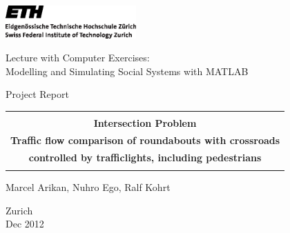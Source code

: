 \thispagestyle{empty}

\begin{center}
\includegraphics[width=5cm]{images/ETHlogo.eps}

\bigskip


\bigskip


\bigskip


\LARGE{ 	Lecture with Computer Exercises:\\ }
\LARGE{ Modelling and Simulating Social Systems with MATLAB\\}

\bigskip

\bigskip

\small{Project Report}\\

\bigskip

\bigskip

\bigskip

\bigskip


\begin{tabular}{|c|}
\hline
\\
\textbf{\LARGE{Intersection Problem}}\\
\textbf{\LARGE{Traffic flow comparison of roundabouts with crossroads}}\\
\textbf{\LARGE{controlled by trafficlights, including pedestrians}}\\
\\
\hline
\end{tabular}
\bigskip

\bigskip

\bigskip

\LARGE{Marcel Arikan, Nuhro Ego, Ralf Kohrt}



\bigskip

\bigskip

\bigskip

\bigskip

\bigskip

\bigskip

\bigskip

\bigskip

Zurich\\
Dec 2012\\

\end{center}